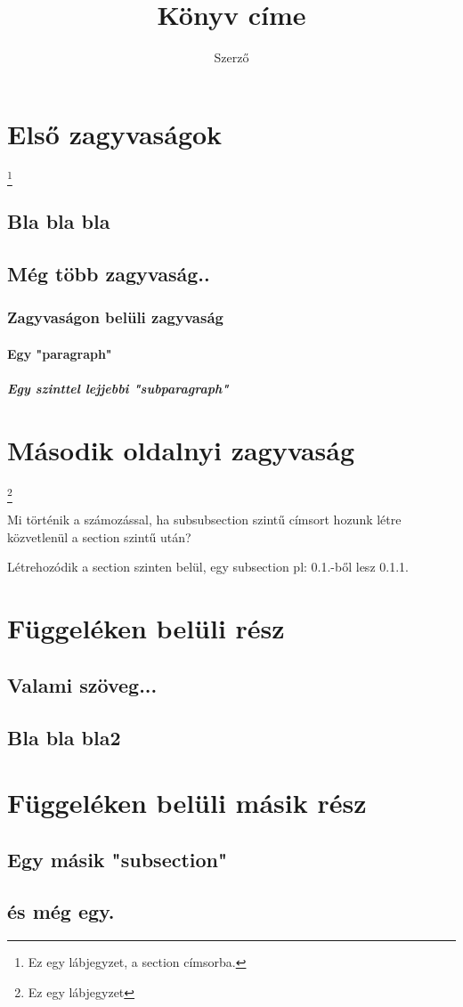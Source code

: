 \documentclass[twoside]{book}
\begin{document}
\title{Könyv címe}
\author{Szerző}
\maketitle

\tableofcontents
\newpage

\section[zagyvaság]{Első zagyvaságok}
\footnote{Ez egy lábjegyzet, a section címsorba.}
\subsection{Bla bla bla}
\hulipsum[2]
\subsection{Még több zagyvaság..}
\hulipsum[2]
\subsubsection{Zagyvaságon belüli zagyvaság}
\paragraph{Egy "paragraph"}
\subparagraph{Egy szinttel lejjebbi "subparagraph"}
\newpage
\section{Második oldalnyi zagyvaság}
\hulipsum[2-3] \linebreak
\footnote{Ez egy lábjegyzet}

{
Mi történik a számozással, ha subsubsection szintű címsort hozunk létre
közvetlenül a section szintű után? \par
Létrehozódik a section szinten belül, egy subsection pl: 0.1.-ből lesz 0.1.1.
}

\appendix
\section{Függeléken belüli rész}
\subsection{Valami szöveg...}
\subsection{Bla bla bla2}

\section{Függeléken belüli másik rész}
\subsection{Egy másik "subsection"}
\subsection{és még egy.}
\end{document}
